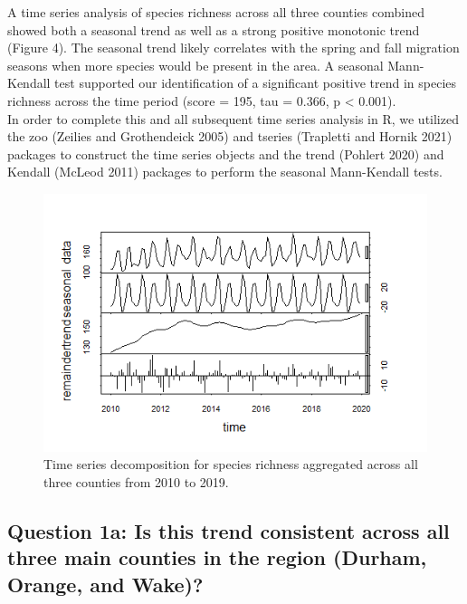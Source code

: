 \documentclass[
  12pt,
]{article}
\begin{document}
A time series analysis of species richness across all three counties
combined showed both a seasonal trend as well as a strong positive
monotonic trend (Figure 4). The seasonal trend likely correlates with
the spring and fall migration seasons when more species would be present
in the area. A seasonal Mann-Kendall test supported our identification
of a significant positive trend in species richness across the time
period (score = 195, tau = 0.366, p \textless{} 0.001).\\
In order to complete this and all subsequent time series analysis in R,
we utilized the zoo (Zeilies and Grothendeick 2005) and tseries
(Trapletti and Hornik 2021) packages to construct the time series
objects and the trend (Pohlert 2020) and Kendall (McLeod 2011) packages
to perform the seasonal Mann-Kendall tests.

\begin{figure}
\centering
\includegraphics{./Output/RT_spp_ts_decomp.png}
\caption{Time series decomposition for species richness aggregated
across all three counties from 2010 to 2019.}
\end{figure}

\clearpage

\hypertarget{question-1a-is-this-trend-consistent-across-all-three-main-counties-in-the-region-durham-orange-and-wake}{%
\subsection{Question 1a: Is this trend consistent across all three main
counties in the region (Durham, Orange, and
Wake)?}\label{question-1a-is-this-trend-consistent-across-all-three-main-counties-in-the-region-durham-orange-and-wake}}
\end{document}
